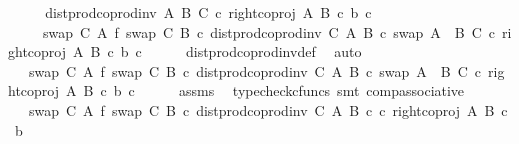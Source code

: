 \begin{isabellebody}
%
\isadelimproof
%
\endisadelimproof
%
\isatagproof
{}\isamarkupfalse%
\ {\isacharminus}{\kern0pt}\isanewline
\ \ \isamarkupfalse%
\ {\isachardoublequoteopen}dist{\isacharunderscore}{\kern0pt}prod{\isacharunderscore}{\kern0pt}coprod{\isacharunderscore}{\kern0pt}inv{}\ A\ B\ C\ {\isasymcirc}\isactrlsub c\ {\isasymlangle}right{\isacharunderscore}{\kern0pt}coproj\ A\ B\ {\isasymcirc}\isactrlsub c\ b{\isacharcomma}{\kern0pt}\ c{\isasymrangle}\isanewline
\ \ \ \ {\isacharequal}{\kern0pt}\ {\isacharparenleft}{\kern0pt}{\isacharparenleft}{\kern0pt}swap\ C\ A\ {\isasymbowtie}\isactrlsub f\ swap\ C\ B{\isacharparenright}{\kern0pt}\ {\isasymcirc}\isactrlsub c\ dist{\isacharunderscore}{\kern0pt}prod{\isacharunderscore}{\kern0pt}coprod{\isacharunderscore}{\kern0pt}inv\ C\ A\ B\ {\isasymcirc}\isactrlsub c\ swap\ {\isacharparenleft}{\kern0pt}A\ {\isasymCoprod}\ B{\isacharparenright}{\kern0pt}\ C{\isacharparenright}{\kern0pt}\ {\isasymcirc}\isactrlsub c\ {\isasymlangle}right{\isacharunderscore}{\kern0pt}coproj\ A\ B\ {\isasymcirc}\isactrlsub c\ b{\isacharcomma}{\kern0pt}\ c{\isasymrangle}{\isachardoublequoteclose}\isanewline
\ \ \ \ \isamarkupfalse%
\ dist{\isacharunderscore}{\kern0pt}prod{\isacharunderscore}{\kern0pt}coprod{\isacharunderscore}{\kern0pt}inv{}{\isacharunderscore}{\kern0pt}def\ \isamarkupfalse%
\ auto\isanewline
\ \ \isamarkupfalse%
\ \isamarkupfalse%
\ {\isachardoublequoteopen}{\isachardot}{\kern0pt}{\isachardot}{\kern0pt}{\isachardot}{\kern0pt}\ {\isacharequal}{\kern0pt}\ {\isacharparenleft}{\kern0pt}swap\ C\ A\ {\isasymbowtie}\isactrlsub f\ swap\ C\ B{\isacharparenright}{\kern0pt}\ {\isasymcirc}\isactrlsub c\ dist{\isacharunderscore}{\kern0pt}prod{\isacharunderscore}{\kern0pt}coprod{\isacharunderscore}{\kern0pt}inv\ C\ A\ B\ {\isasymcirc}\isactrlsub c\ swap\ {\isacharparenleft}{\kern0pt}A\ {\isasymCoprod}\ B{\isacharparenright}{\kern0pt}\ C\ {\isasymcirc}\isactrlsub c\ {\isasymlangle}right{\isacharunderscore}{\kern0pt}coproj\ A\ B\ {\isasymcirc}\isactrlsub c\ b{\isacharcomma}{\kern0pt}\ c{\isasymrangle}{\isachardoublequoteclose}\isanewline
\ \ \ \ \isamarkupfalse%
\ assms\ \isamarkupfalse%
\ {\isacharparenleft}{\kern0pt}typecheck{\isacharunderscore}{\kern0pt}cfuncs{\isacharcomma}{\kern0pt}\ smt\ comp{\isacharunderscore}{\kern0pt}associative{}{\isacharparenright}{\kern0pt}\isanewline
\ \ \isamarkupfalse%
\ \isamarkupfalse%
\ {\isachardoublequoteopen}{\isachardot}{\kern0pt}{\isachardot}{\kern0pt}{\isachardot}{\kern0pt}\ {\isacharequal}{\kern0pt}\ {\isacharparenleft}{\kern0pt}swap\ C\ A\ {\isasymbowtie}\isactrlsub f\ swap\ C\ B{\isacharparenright}{\kern0pt}\ {\isasymcirc}\isactrlsub c\ dist{\isacharunderscore}{\kern0pt}prod{\isacharunderscore}{\kern0pt}coprod{\isacharunderscore}{\kern0pt}inv\ C\ A\ B\ {\isasymcirc}\isactrlsub c\ {\isasymlangle}c{\isacharcomma}{\kern0pt}\ right{\isacharunderscore}{\kern0pt}coproj\ A\ B\ {\isasymcirc}\isactrlsub c\ b{\isasymrangle}{\isachardoublequoteclose}\isanewline

\end{isabellebody}
